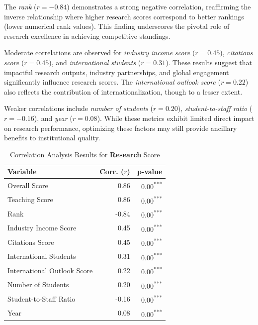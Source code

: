 \documentclass[conference]{IEEEtran}
\begin{document}
The \textit{rank} ($r = -0.84$) demonstrates a strong negative correlation, reaffirming the inverse relationship where higher research scores correspond to better rankings (lower numerical rank values). This finding underscores the pivotal role of research excellence in achieving competitive standings.

Moderate correlations are observed for \textit{industry income score} ($r = 0.45$), \textit{citations score} ($r = 0.45$), and \textit{international students} ($r = 0.31$). These results suggest that impactful research outputs, industry partnerships, and global engagement significantly influence research scores. The \textit{international outlook score} ($r = 0.22$) also reflects the contribution of internationalization, though to a lesser extent.

Weaker correlations include \textit{number of students} ($r = 0.20$), \textit{student-to-staff ratio} ($r = -0.16$), and \textit{year} ($r = 0.08$). While these metrics exhibit limited direct impact on research performance, optimizing these factors may still provide ancillary benefits to institutional quality.

\begin{table}[h!]
	\centering
	\caption{Correlation Analysis Results for \textbf{Research} Score}
	\label{tab:correlation_research}
	\begin{tabular}{|l|r|r|}
		\hline
		\textbf{Variable} & \textbf{Corr. ($r$)} & \textbf{p-value} \\
		\hline
		Overall Score & 0.86 & 0.00\textsuperscript{***} \\
		Teaching Score & 0.86 & 0.00\textsuperscript{***} \\
		Rank & -0.84 & 0.00\textsuperscript{***} \\
		Industry Income Score & 0.45 & 0.00\textsuperscript{***} \\
		Citations Score & 0.45 & 0.00\textsuperscript{***} \\
		International Students & 0.31 & 0.00\textsuperscript{***} \\
		International Outlook Score & 0.22 & 0.00\textsuperscript{***} \\
		Number of Students & 0.20 & 0.00\textsuperscript{***} \\
		Student-to-Staff Ratio & -0.16 & 0.00\textsuperscript{***} \\
		Year & 0.08 & 0.00\textsuperscript{***} \\
		\hline
	\end{tabular}
\end{table}
\end{document}
